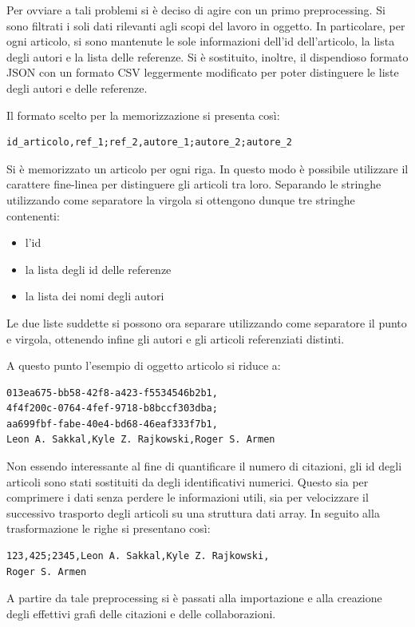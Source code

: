 \documentclass[a4paper, 12pt]{article}
\begin{document}
Per ovviare a tali problemi si è deciso di agire con un primo preprocessing. Si sono filtrati i soli dati rilevanti agli scopi del lavoro in oggetto. In particolare, per ogni articolo, si sono mantenute le sole informazioni dell'id dell'articolo, la lista degli autori e la lista delle referenze. Si è sostituito, inoltre, il dispendioso formato JSON con un formato CSV leggermente modificato per poter distinguere le liste degli autori e delle referenze.
\par
Il formato scelto per la memorizzazione si presenta così:
\begin{lstlisting}[keepspaces=true]
id_articolo,ref_1;ref_2,autore_1;autore_2;autore_2
\end{lstlisting}
Si è memorizzato un articolo per ogni riga. In questo modo è possibile utilizzare il carattere fine-linea per distinguere gli articoli tra loro.
Separando le stringhe utilizzando come separatore la virgola si ottengono dunque tre stringhe contenenti:
\begin{itemize}
  \item l'id
  \item la lista degli id delle referenze
  \item la lista dei nomi degli autori
\end{itemize}
Le due liste suddette si possono ora separare utilizzando come separatore il punto e virgola, ottenendo infine gli autori e gli articoli referenziati distinti.

A questo punto l'esempio di oggetto articolo si riduce a:
\begin{lstlisting}
013ea675-bb58-42f8-a423-f5534546b2b1,
4f4f200c-0764-4fef-9718-b8bccf303dba;
aa699fbf-fabe-40e4-bd68-46eaf333f7b1,
Leon A. Sakkal,Kyle Z. Rajkowski,Roger S. Armen
\end{lstlisting}

Non essendo interessante al fine di quantificare il numero di citazioni, gli id degli articoli sono stati sostituiti da degli identificativi numerici. Questo sia per comprimere i dati senza perdere le informazioni utili, sia per velocizzare il successivo trasporto degli articoli su una struttura dati array.
In seguito alla trasformazione le righe si presentano così:
\begin{lstlisting}
123,425;2345,Leon A. Sakkal,Kyle Z. Rajkowski,
Roger S. Armen
\end{lstlisting}
A partire da tale preprocessing si è passati alla importazione e alla creazione degli effettivi grafi delle citazioni e delle collaborazioni.
\end{document}
